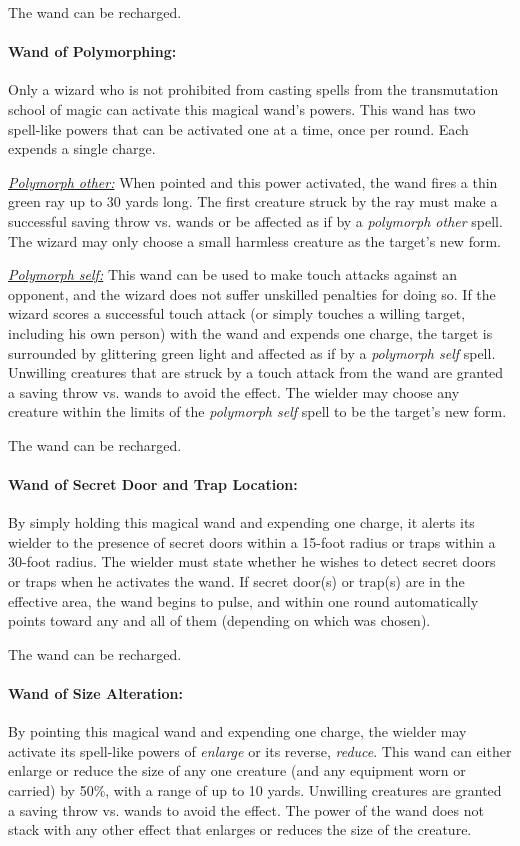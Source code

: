 \begin{multicols}{2}
The wand can be recharged.

\paragraph{Wand of Polymorphing:}  Only a wizard who is not prohibited from casting spells from the transmutation school of magic can activate this magical wand's powers.  This wand has two spell-like powers that can be activated one at a time, once per round.  Each expends a single charge.

\underline{\textit{Polymorph other:}} When pointed and this power activated, the wand fires a thin green ray up to 30 yards long.  The first creature struck by the ray must make a successful saving throw vs. wands or be affected as if by a \textit{polymorph other} spell.  The wizard may only choose a small harmless creature as the target's new form.

\underline{\textit{Polymorph self:}} This wand can be used to make touch attacks against an opponent, and the wizard does not suffer unskilled penalties for doing so.  If the wizard scores a successful touch attack (or simply touches a willing target, including his own person) with the wand and expends one charge, the target is surrounded by glittering green light and affected as if by a \textit{polymorph self} spell.  Unwilling creatures that are struck by a touch attack from the wand are granted a saving throw vs. wands to avoid the effect.  The wielder may choose any creature within the limits of the \textit{polymorph self} spell to be the target's new form.

The wand can be recharged.

\paragraph{Wand of Secret Door and Trap Location:} By simply holding this magical wand and expending one charge, it alerts its wielder to the presence of secret doors within a 15-foot radius or traps within a 30-foot radius.  The wielder must state whether he wishes to detect secret doors or traps when he activates the wand.  If secret door(s) or trap(s) are in the effective area, the wand begins to pulse, and within one round automatically points toward any and all of them (depending on which was chosen).  

The wand can be recharged.

\paragraph{Wand of Size Alteration:} By pointing this magical wand and expending one charge, the wielder may activate its spell-like powers of \textit{enlarge} or its reverse, \textit{reduce}.  This wand can either enlarge or reduce the size of any one creature (and any equipment worn or carried) by 50\%, with a range of up to 10 yards.  Unwilling creatures are granted a saving throw vs. wands to avoid the effect.  The power of the wand does not stack with any other effect that enlarges or reduces the size of the creature.  


\end{multicols}
